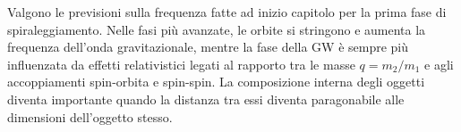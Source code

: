 Valgono le previsioni sulla frequenza fatte ad inizio capitolo per la prima fase di spiraleggiamento. Nelle fasi più avanzate, le orbite si stringono e aumenta la frequenza dell'onda gravitazionale, mentre la fase della GW è sempre più influenzata da effetti relativistici legati al rapporto tra le masse $q = m_2/m_1$ e agli accoppiamenti spin-orbita e spin-spin. La composizione interna degli oggetti diventa importante quando la distanza tra essi diventa paragonabile alle dimensioni dell'oggetto stesso. 

